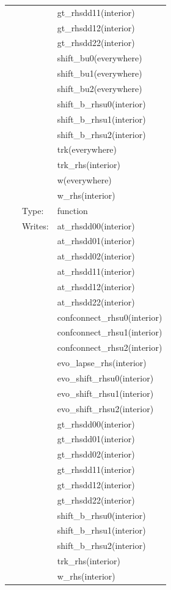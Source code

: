 \documentclass{article}
\begin{document}
\begin{tabular*}{160mm}{cll}
~& ~ &gt\_rhsdd11(interior)\\ 
~& ~ &gt\_rhsdd12(interior)\\ 
~& ~ &gt\_rhsdd22(interior)\\ 
~& ~ &shift\_bu0(everywhere)\\ 
~& ~ &shift\_bu1(everywhere)\\ 
~& ~ &shift\_bu2(everywhere)\\ 
~& ~ &shift\_b\_rhsu0(interior)\\ 
~& ~ &shift\_b\_rhsu1(interior)\\ 
~& ~ &shift\_b\_rhsu2(interior)\\ 
~& ~ &trk(everywhere)\\ 
~& ~ &trk\_rhs(interior)\\ 
~& ~ &w(everywhere)\\ 
~& ~ &w\_rhs(interior)\\ 
~ & Type:  & function \\ 
~ & Writes:  & at\_rhsdd00(interior) \\ 
~& ~ &at\_rhsdd01(interior)\\ 
~& ~ &at\_rhsdd02(interior)\\ 
~& ~ &at\_rhsdd11(interior)\\ 
~& ~ &at\_rhsdd12(interior)\\ 
~& ~ &at\_rhsdd22(interior)\\ 
~& ~ &confconnect\_rhsu0(interior)\\ 
~& ~ &confconnect\_rhsu1(interior)\\ 
~& ~ &confconnect\_rhsu2(interior)\\ 
~& ~ &evo\_lapse\_rhs(interior)\\ 
~& ~ &evo\_shift\_rhsu0(interior)\\ 
~& ~ &evo\_shift\_rhsu1(interior)\\ 
~& ~ &evo\_shift\_rhsu2(interior)\\ 
~& ~ &gt\_rhsdd00(interior)\\ 
~& ~ &gt\_rhsdd01(interior)\\ 
~& ~ &gt\_rhsdd02(interior)\\ 
~& ~ &gt\_rhsdd11(interior)\\ 
~& ~ &gt\_rhsdd12(interior)\\ 
~& ~ &gt\_rhsdd22(interior)\\ 
~& ~ &shift\_b\_rhsu0(interior)\\ 
~& ~ &shift\_b\_rhsu1(interior)\\ 
~& ~ &shift\_b\_rhsu2(interior)\\ 
~& ~ &trk\_rhs(interior)\\ 
~& ~ &w\_rhs(interior)\\ 
\end{tabular*} 
\end{document}
